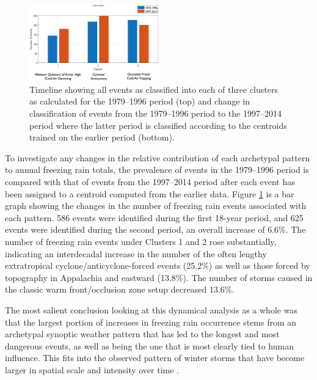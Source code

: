 \documentclass[twocol]{ametsoc}
\begin{document}
\begin{figure}
\centering
\includegraphics[width=0.5\textwidth]{Storm_Pattern_Change.png}
\caption{\label{fig:clusterchange} Timeline showing all events as classified into each of three clusters as calculated for the 1979--1996 period (top) and change in classification of events from the 1979--1996 period to the 1997--2014 period where the latter period is classified according to the centroids trained on the earlier period (bottom).}
\end{figure}

To investigate any changes in the relative contribution of each archetypal pattern to annual freezing rain totals, the prevalence of events in the 1979--1996 period is compared with that of events from the 1997--2014 period after each event has been assigned to a centroid computed from the earlier data. Figure \ref{fig:clusterchange} is a bar graph showing the changes in the number of freezing rain events associated with each pattern. 586 events were identified during the first 18-year period, and 625 events were identified during the second period, an overall increase of 6.6\%. The number of freezing rain events under Clusters 1 and 2  rose substantially, indicating an interdecadal increase in the number of the often lengthy extratropical cyclone/anticyclone-forced events (25.2\%) as well as those forced by topography in Appalachia and eastward (13.8\%). The number of storms caused in the classic warm front/occlusion zone setup decreased 13.6\%. 

The most salient conclusion looking at this dynamical analysis as a whole was that the largest portion of increases in freezing rain occurrence stems from an archetypal synoptic weather pattern that has led to the longest and most dangerous events, as well as being the one that is most clearly tied to human influence. This fits into the observed pattern of winter storms that have become larger in spatial scale and intensity over time \citep{changnon2007catastrophic}. 
\end{document}
